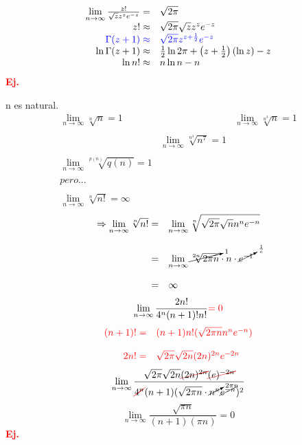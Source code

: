 \documentclass{article}
\theoremstyle{definition}
\begin{document}
\[
\begin{array}{rl}
	\lim\limits_{n\to \infty}\frac{z!}{\sqrt{z}z^ze^{-z}}=& \sqrt{2\pi}\\
	z!\approx &\sqrt{2\pi}\sqrt{z}z^ze^{-z}\\
	\textcolor{blue}{\Gamma (z+1)\approx} & \textcolor{blue}{\sqrt{2\pi} z^{z+\frac{1}{2}}e^{-z}}\\
	\ln \Gamma (z+1) \approx & \frac{1}{2} \ln 2\pi +\left( z+\frac{1}{2}\right)(\ln z)-z\\
	\ln n! \approx & n\ln n - n 
\end{array}
\]
\textbf{\textcolor{red}{Ej.}}

n es natural.
\[
\begin{array}{lcr}
	\lim\limits_{n\to \infty} \sqrt[n]{n}=1 && \lim\limits_{n\to \infty} \sqrt[n^3]{n}=1\\
	\\
	&\lim\limits_{n\to \infty} \sqrt[n^3]{n^7}=1\\
	\\
	\lim\limits_{n\to \infty} \sqrt[p(n)]{q(n)}=1\\
	\\
	\textit{pero...}\\
	\\
	\lim\limits_{n\to \infty} \sqrt[n]{n!}=\infty
\end{array}
\]
\[
\begin{array}{rl}
	\Rightarrow \lim\limits_{n\to \infty} \sqrt[n]{n!}=& \lim\limits_{n\to \infty}\sqrt[n]{\sqrt{2\pi}\sqrt{n}n^ne^{-n}}\\
	\\
	=& \lim\limits_{n\to \infty} \cancelto{1}{\sqrt[2n]{2\pi n}}\cdot n\cdot \cancelto{\frac{1}{e}}{e^{-1}}\\
	\\
	=& \infty
\end{array}
\]
\[\lim\limits_{n\to \infty} \frac{2n!}{4^n(n+1)!n!}\textcolor{red}{=0}\]
\[\textcolor{red}{
\begin{array}{rl}
	(n+1)!=& (n+1)n!(\sqrt{2\pi n } n^n e^{-n})\\
	\\
	2n!=& \sqrt{2\pi}\sqrt{2n}(2n)^{2n}e^{-2n}
\end{array}
}\]
\[\lim\limits_{n\to \infty}\frac{\sqrt{2\pi} \sqrt{2n}\textcolor{red}{\cancel{\textcolor{black}{(2n)^{2n}}}\cancel{\textcolor{black}{(e)^{-2n}}}}}{\textcolor{red}{\cancel{\textcolor{black}{4^n}}}(n+1)(\sqrt{2\pi n}\cdot \cancelto{2\pi n}{n^n}\cancel{e^{-n}})^2}\]
\[\lim\limits_{n\to \infty} \frac{\sqrt{\pi n}}{(n+1)(\pi n)}=0\]
\textbf{\textcolor{red}{Ej.}}
\end{document}
